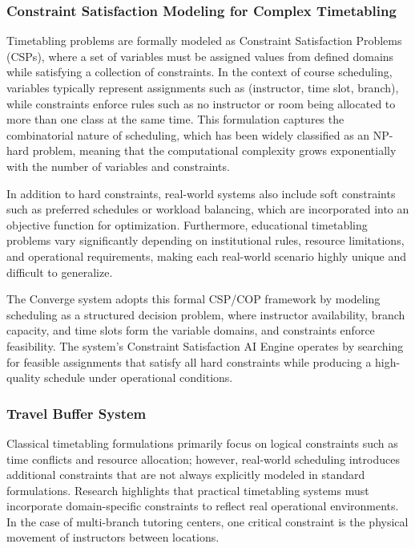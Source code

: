 \subsubsection{Constraint Satisfaction Modeling for Complex Timetabling}
Timetabling problems are formally modeled as Constraint Satisfaction Problems (CSPs), where a set of variables must be assigned values from defined domains while satisfying a collection of constraints. In the context of course scheduling, variables typically represent assignments such as (instructor, time slot, branch), while constraints enforce rules such as no instructor or room being allocated to more than one class at the same time. This formulation captures the combinatorial nature of scheduling, which has been widely classified as an NP-hard problem, meaning that the computational complexity grows exponentially with the number of variables and constraints\cite{elsakka2015}.

In addition to hard constraints, real-world systems also include soft constraints such as preferred schedules or workload balancing, which are incorporated into an objective function for optimization. Furthermore, educational timetabling problems vary significantly depending on institutional rules, resource limitations, and operational requirements, making each real-world scenario highly unique and difficult to generalize\cite{ceschia2022}.

The Converge system adopts this formal CSP/COP framework by modeling scheduling as a structured decision problem, where instructor availability, branch capacity, and time slots form the variable domains, and constraints enforce feasibility. The system’s Constraint Satisfaction AI Engine operates by searching for feasible assignments that satisfy all hard constraints while producing a high-quality schedule under operational conditions.
\subsubsection{Travel Buffer System}
Classical timetabling formulations primarily focus on logical constraints such as time conflicts and resource allocation; however, real-world scheduling introduces additional constraints that are not always explicitly modeled in standard formulations. Research highlights that practical timetabling systems must incorporate domain-specific constraints to reflect real operational environments\cite{schaerf1999}. In the case of multi-branch tutoring centers, one critical constraint is the physical movement of instructors between locations.

